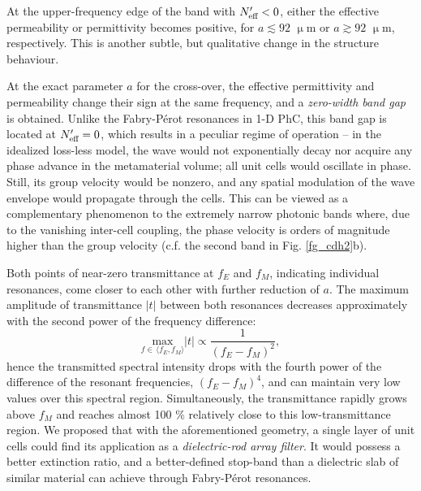 At the upper-frequency edge of the band with $N_{\text{eff} }'<0$, either the effective permeability or permittivity becomes positive, for $a\lesssim 92$ $\upmu$m or  $a\gtrsim 92$ $\upmu$m, respectively. This is another subtle, but qualitative change in the structure behaviour. 

At the exact parameter $a$ for the cross-over, the effective permittivity and permeability change their sign at the same frequency, and a \textit{zero-width band gap} is obtained. Unlike the Fabry-Pérot resonances in 1-D PhC, this band gap is located at $N_{\text{eff} }'=0$, which results in a peculiar regime of operation -- in the idealized loss-less model, the wave would not exponentially decay nor acquire any phase advance in the metamaterial volume; all unit cells would oscillate in phase. Still, its group velocity would be nonzero, and any spatial modulation of the wave envelope would propagate through the cells. This can be viewed as a complementary phenomenon to the extremely narrow photonic bands where, due to the vanishing inter-cell coupling, the phase velocity is orders of magnitude higher than the group velocity (c.f. the second band in Fig. \ref{fg_cdh2}b).

Both points of near-zero transmittance at $f_E$ and $f_M$, indicating individual resonances, come closer to each other with further reduction of $a$. The maximum amplitude of transmittance $|t|$ between both resonances decreases approximately with the second power of the frequency difference:
\begin{equation} \underset{f \in\,\langle f_E,f_M\rangle}{\text{max}} |t| \propto \frac{1}{(f_E-f_M)^{2}}, \label{eq_fEfM}\end{equation}
hence the transmitted spectral intensity drops with the fourth power of the difference of the resonant frequencies, $(f_E-f_M)^4$, and can maintain very low values over this spectral region. Simultaneously, the transmittance rapidly grows above $f_M$ and reaches almost 100 \% relatively close to this low-transmittance region. 
We proposed \cite{dominec2014transition} that with the aforementioned geometry, a single layer of unit cells could find its application as a \textit{dielectric-rod array filter}. It would possess a better extinction ratio, and a better-defined stop-band than a dielectric slab of similar material can achieve through Fabry-Pérot resonances.

